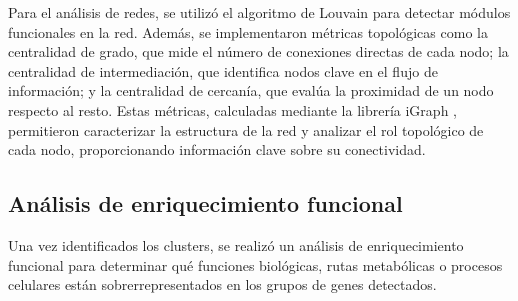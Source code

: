 Para el análisis de redes, se utilizó el algoritmo de Louvain \cite{Blondel2008} para detectar módulos funcionales en la red. Además, se implementaron métricas topológicas como la centralidad de grado, que mide el número de conexiones directas de cada nodo; la centralidad de intermediación, que identifica nodos clave en el flujo de información; y la centralidad de cercanía, que evalúa la proximidad de un nodo respecto al resto. Estas métricas, calculadas mediante la librería iGraph \cite{Csardi2006}, permitieron caracterizar la estructura de la red y analizar el rol topológico de cada nodo, proporcionando información clave sobre su conectividad.

\subsection{Análisis de enriquecimiento funcional}

Una vez identificados los clusters, se realizó un análisis de enriquecimiento funcional para determinar qué funciones biológicas, rutas metabólicas o procesos celulares están sobrerrepresentados en los grupos de genes detectados.